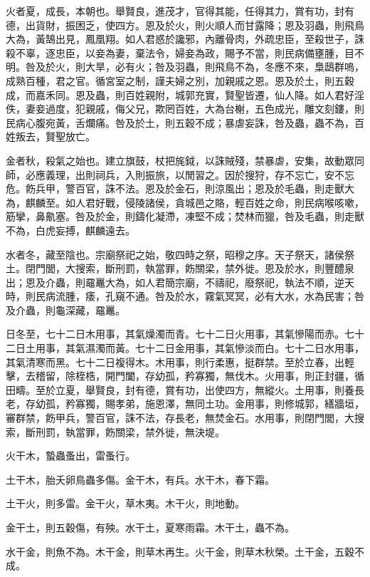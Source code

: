 火者夏，成長，本朝也。舉賢良，進茂才，官得其能，任得其力，賞有功，封有德，出貨財，振困乏，使四方。恩及於火，則火順人而甘露降；恩及羽蟲，則飛鳥大為，黃鵠出見，鳳凰翔。如人君惑於讒邪，內離骨肉，外疏忠臣，至殺世子，誅殺不辜，逐忠臣，以妾為妻，棄法令，婦妾為政，賜予不當，則民病備壅腫，目不明。咎及於火，則大旱，必有火；咎及羽蟲，則飛鳥不為，冬應不來，梟鴟群嗚，成熟百種，君之官。循宮室之制，謹夫婦之別，加親戚之恩。恩及於土，則五穀成，而嘉禾同。恩及蟲，則百姓親附，城郭充實，賢聖皆遷，仙人降。如人君好淫佚，妻妾過度，犯親戚，侮父兄，欺罔百姓，大為台榭，五色成光，雕文刻鏤，則民病心腹宛黃，舌爛痛。咎及於土，則五穀不成；暴虐妄誅，咎及蟲，蟲不為，百姓叛去，賢聖放亡。


金者秋，殺氣之始也。建立旗鼓，杖把旄鉞，以誅賊殘，禁暴虐，安集，故動眾同師，必應義理，出則祠兵，入則振旅，以閒習之。因於搜狩，存不忘亡，安不忘危。飭兵甲，警百官，誅不法。恩及於金石，則涼風出；恩及於毛蟲，則走獸大為，麒麟至。如人君好戰，侵陵諸侯，貪城邑之賂，輕百姓之命，則民病喉咳嗽，筋攣，鼻鼽塞。咎及於金，則鑄化凝滯，凍堅不成；焚林而獵，咎及毛蟲，則走獸不為，白虎妄搏，麒麟遠去。


水者冬，藏至陰也。宗廟祭祀之始，敬四時之祭，昭穆之序。天子祭天，諸侯祭土。閉門閭，大搜索，斷刑罰，執當罪，飭關梁，禁外徙。恩及於水，則豐醴泉出；恩及介蟲，則黿鼉大為，如人君簡宗廟，不禱祀，廢祭祀，執法不順，逆天時，則民病流腫，痿，孔窺不通。咎及於水，霧氣冥冥，必有大水，水為民害；咎及介蟲，則龜深藏，黿鼉。



日冬至，七十二日木用事，其氣燥濁而青。七十二日火用事，其氣慘陽而赤。七十二日土用事，其氣濕濁而黃。七十二日金用事，其氣慘淡而白。七十二日水用事，其氣清寒而黑。七十二日複得木。木用事，則行柔惠，挺群禁。至於立春，出輕擊，去稽留，除桎梏，開門闔，存幼孤，矜寡獨，無伐木。火用事，則正封疆，循田疇。至於立夏，舉賢良，封有德，賞有功，出使四方，無縱火。土用事，則養長老，存幼孤，矜寡獨，賜孝弟，施恩澤，無同土功。金用事，則修城郭，繕牆垣，審群禁，飭甲兵，警百官，誅不法，存長老，無焚金石。水用事，則閉門閭，大搜索，斷刑罰，執當罪，飭關梁，禁外徙，無決堤。


火干木，蟄蟲蚤出，雷蚤行。

土干木，胎夭卵鳥蟲多傷。金干木，有兵。水干木，春下霜。


土干火，則多雷。金干火，草木夷。木干火，則地動。

金干土，則五穀傷，有殃。水干土，夏寒雨霜。木干土，蟲不為。


水干金，則魚不為。木干金，則草木再生。火干金，則草木秋榮。土干金，五穀不成。

